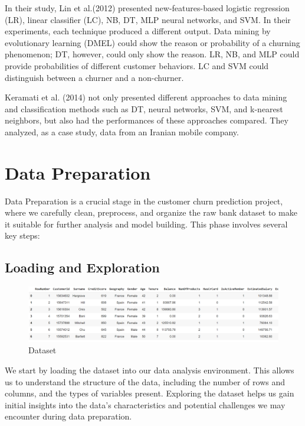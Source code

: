 \documentclass[11pt,a4paper]{article}
\begin{document}
In their study, Lin et al.(2012) presented new-features-based logistic regression (LR), linear classifier (LC), NB, DT, MLP neural networks, and SVM. In their experiments, each technique produced a different output. Data mining by evolutionary learning (DMEL) could show the reason or probability of a churning phenomenon; DT, however, could only show the reason. LR, NB, and MLP could provide probabilities of different customer behaviors. LC and SVM could distinguish between a churner and a non-churner. \cite{LIN20118}

Keramati et al. (2014) not only presented different approaches to data mining and classification methods such as DT, neural networks, SVM, and k-nearest neighbors, but also had the performances of these approaches compared. They analyzed, as a case study, data from an Iranian mobile company. \cite{NIE201115273}



\section{Data Preparation}

Data Preparation is a crucial stage in the customer churn prediction project, where we carefully clean, preprocess, and organize the raw bank dataset to make it suitable for further analysis and model building. This phase involves several key steps: 

\subsection{Loading and Exploration}

\begin{figure}[H]
    \centering
    \includegraphics[width=1\textwidth]{Load the data.png}
    \caption{Dataset}
    \label{fig:enter-label}
\end{figure}

We start by loading the dataset into our data analysis environment. This allows us to understand the structure of the data, including the number of rows and columns, and the types of variables present. Exploring the dataset helps us gain initial insights into the data's characteristics and potential challenges we may encounter during data preparation.
\end{document}
